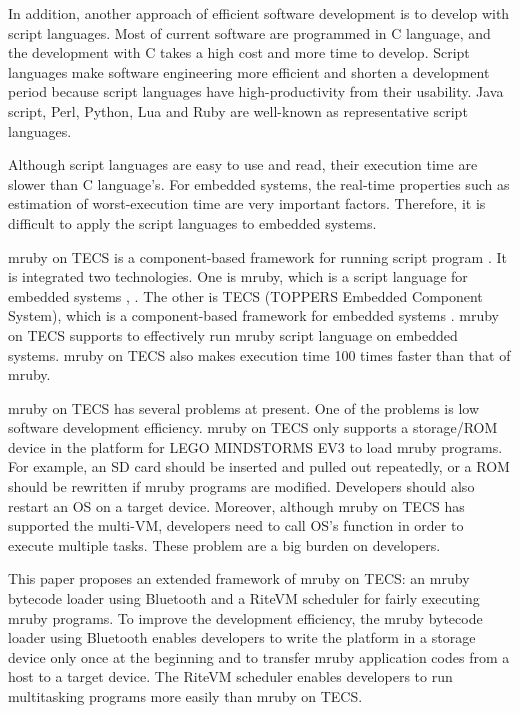 \documentclass[a4j,12pt,oneside,openany,english]{jsbook}
\begin{document}
In addition, another approach of efficient software development is to develop with script languages.
Most of current software are programmed in C language, and the development with C takes a high cost and more time to develop.
Script languages make software engineering more efficient and shorten a development period because script languages have high-productivity from their usability.
Java script, Perl, Python, Lua and Ruby are well-known as representative script languages.

Although script languages are easy to use and read, their execution time are slower than C language's.
For embedded systems, the real-time properties such as estimation of worst-execution time are very important factors.
Therefore, it is difficult to apply the script languages to embedded systems.

mruby on TECS is a component-based framework for running script program \cite{par:mrubyonTECS}.
It is integrated two technologies.
One is mruby, which is a script language for embedded systems \cite{par:mruby}, \cite{url:mruby}.
The other is TECS (TOPPERS Embedded Component System), which is a component-based framework for embedded systems \cite{par:TECS} \cite{url:TOPPERS}.
mruby on TECS supports to effectively run mruby script language on embedded systems.
mruby on TECS also makes execution time 100 times faster than that of mruby.

mruby on TECS has several problems at present.
One of the problems is low software development efficiency.
mruby on TECS only supports a storage/ROM device in the platform for LEGO MINDSTORMS EV3 \cite{par:EV3} to load mruby programs.
For example, an SD card should be inserted and pulled out repeatedly, or a ROM should be rewritten if mruby programs are modified.
Developers should also restart an OS on a target device.
Moreover, although mruby on TECS has supported the multi-VM, developers need to call OS's function in order to execute multiple tasks.
These problem are a big burden on developers.

This paper proposes an extended framework of mruby on TECS: an mruby bytecode loader using Bluetooth and a RiteVM scheduler for fairly executing mruby programs.
To improve the development efficiency, the mruby bytecode loader using Bluetooth enables developers to write the platform in a storage device only once at the beginning and to transfer mruby application codes from a host to a target device.
The RiteVM scheduler enables developers to run multitasking programs more easily than mruby on TECS.
\end{document}
